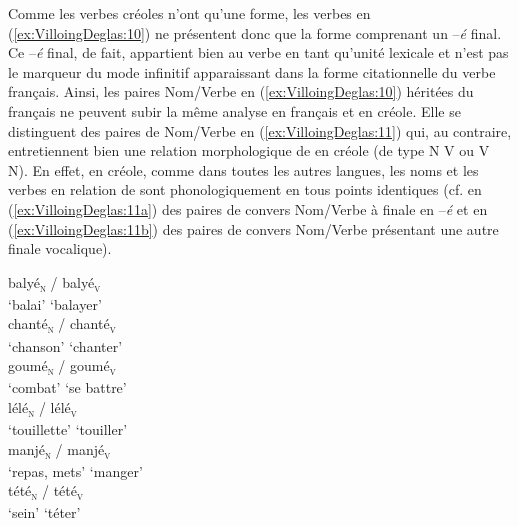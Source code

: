 \documentclass[output=paper]{langsci/langscibook}
\begin{document}
Comme les verbes créoles n'ont qu'une forme, les verbes en (\ref{ex:VilloingDeglas:10}) ne
présentent donc que la forme comprenant un --\emph{é} final. Ce
--\emph{é} final, de fait, appartient bien au verbe en tant qu'unité
lexicale et n'est pas le marqueur du mode infinitif apparaissant dans la
forme citationnelle du verbe français. Ainsi, les paires Nom/Verbe en
(\ref{ex:VilloingDeglas:10}) héritées du français ne peuvent subir la même analyse en français
et en créole. Elle se distinguent des paires de Nom/Verbe en (\ref{ex:VilloingDeglas:11}) qui,
au contraire, entretiennent bien une relation morphologique de
 en créole (de type N\textrightarrow{~} V ou V\textrightarrow{~} N). En effet, en créole, comme
dans toutes les autres langues, les noms et les verbes en relation de
 sont phonologiquement en tous points identiques (cf. en (\ref{ex:VilloingDeglas:11a})
des paires de convers Nom/Verbe à finale en --\emph{é} et en (\ref{ex:VilloingDeglas:11b}) des
paires de convers Nom/Verbe présentant une autre finale vocalique).


\ea\label{ex:VilloingDeglas:11}

  \ea\label{ex:VilloingDeglas:11a}

  \ea \gll balyé\textsubscript{\textsc{n}} / balyé\textsubscript{\textsc{v}}\\
  {`balai'} {} {`balayer'}\\
  \ex \gll chanté\textsubscript{\textsc{n}} / chanté\textsubscript{\textsc{v}}\\
  {`chanson'} {} {`chanter'}\\
  \ex \gll goumé\textsubscript{\textsc{n}} / goumé\textsubscript{\textsc{v}}\\
  {`combat'} {} {`se battre'}\\
  \ex \gll lélé\textsubscript{\textsc{n}} / lélé\textsubscript{\textsc{v}}\\
  {`touillette'} {} {`touiller'}\\
  \ex \gll manjé\textsubscript{\textsc{n}} / manjé\textsubscript{\textsc{v}}\\
  {`repas, mets'} {} {`manger'}\\
  \ex \gll tété\textsubscript{\textsc{n}} / tété\textsubscript{\textsc{v}}\\
  {`sein'} {} {`téter'}\\
  \z

  \ex\label{ex:VilloingDeglas:11b}
\end{document}
